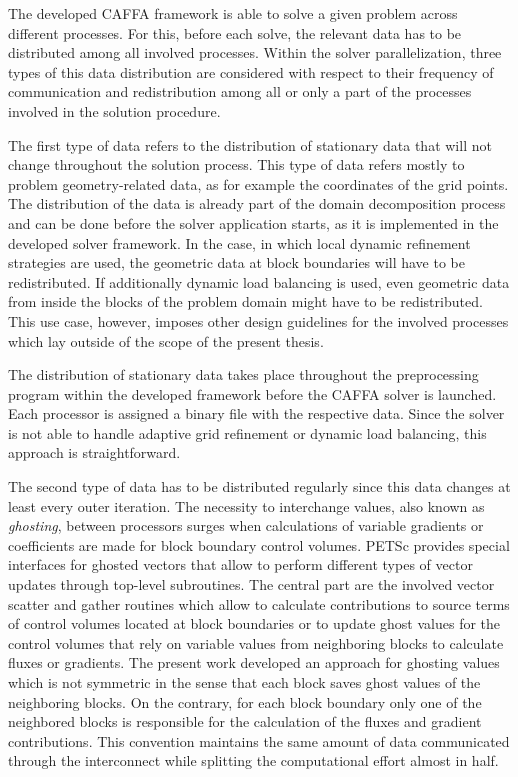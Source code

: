 The developed CAFFA framework is able to solve a given problem across different processes. For this, before each solve, the relevant data has to be distributed among all involved processes. Within the solver parallelization, three types of this data distribution are considered with respect to their frequency of communication and redistribution among all or only a part of the processes involved in the solution procedure. 

The first type of data refers to the distribution of stationary data that will not change throughout the solution process. This type of data refers mostly to problem geometry-related data, as for example the coordinates of the grid points. The distribution of the data is already part of the domain decomposition process and can be done before the solver application starts, as it is implemented in the developed solver framework. In the case, in which local dynamic refinement strategies are used, the geometric data at block boundaries will have to be redistributed. If additionally dynamic load balancing is used, even geometric data from inside the blocks of the problem domain might have to be redistributed. This use case, however, imposes other design guidelines for the involved processes which lay outside of the scope of the present thesis.

The distribution of stationary data takes place throughout the preprocessing program within the developed framework before the CAFFA solver is launched. Each processor is assigned a binary file with the respective data. Since the solver is not able to handle adaptive grid refinement or dynamic load balancing, this approach is straightforward.

The second type of data has to be distributed regularly since this data changes at least every outer iteration. The necessity to interchange values, also known as \emph{ghosting}, between processors surges when calculations of variable gradients or coefficients are made for block boundary control volumes. PETSc provides special interfaces for ghosted vectors that allow to perform different types of vector updates through top-level subroutines. The central part are the involved vector scatter and gather routines which allow to calculate contributions to source terms of control volumes located at block boundaries or to update ghost values for the control volumes that rely on variable values from neighboring blocks to calculate fluxes or gradients. The present work developed an approach for ghosting values which is not symmetric in the sense that each block saves ghost values of the neighboring blocks. On the contrary, for each block boundary only one of the neighbored blocks is responsible for the calculation of the fluxes and gradient contributions. This convention maintains the same amount of data communicated through the interconnect while splitting the computational effort almost in half.

